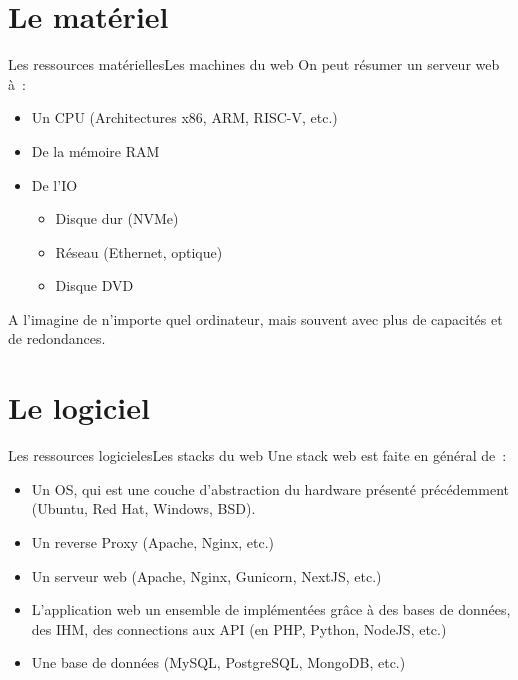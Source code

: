 \documentclass{beamer}
\begin{document}
    \section{Le matériel}\label{sec:le-materielle}

    \begin{frame}{Les ressources matérielles}{Les machines du web}
        On peut résumer un serveur web à~:
        \begin{itemize}
            \item Un CPU (Architectures x86, ARM, RISC-V, etc.)
            \item De la mémoire RAM
            \item De l'IO
            \begin{itemize}
                \item Disque dur (NVMe)
                \item Réseau (Ethernet, optique)
                \item Disque DVD
            \end{itemize}
        \end{itemize}
        A l'imagine de n'importe quel ordinateur, mais souvent avec plus de capacités et de redondances.
    \end{frame}


    \section{Le logiciel}\label{sec:le-logiciel}

    \begin{frame}{Les ressources logicieles}{Les stacks du web}
        Une stack web est faite en général de~:
        \begin{itemize}
            \item Un OS, qui est une couche d'abstraction du hardware présenté précédemment (Ubuntu, Red Hat, Windows, BSD).
            \item Un reverse Proxy (Apache, Nginx, etc.)
            \item Un serveur web (Apache, Nginx, Gunicorn, NextJS, etc.)
            \item L'application web un ensemble de  implémentées grâce à des bases de données, des IHM, des connections aux API (en PHP, Python, NodeJS, etc.)
            \item Une base de données (MySQL, PostgreSQL, MongoDB, etc.)
        \end{itemize}
    \end{frame}
\end{document}
